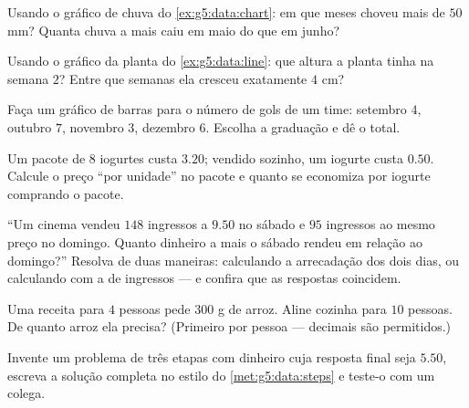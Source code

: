 \begin{exercise}[$\star$]\label{exo:g5:data:5}
Usando o gráfico de chuva do \cref{ex:g5:data:chart}: em que meses
choveu mais de $50$ mm? Quanta chuva a mais caiu em maio do que em
junho?
\end{exercise}

\begin{exercise}[$\star$]\label{exo:g5:data:6}
Usando o gráfico da planta do \cref{ex:g5:data:line}: que altura a
planta tinha na semana $2$? Entre que semanas ela cresceu exatamente
$4$ cm?
\end{exercise}

\begin{exercise}[$\star$]\label{exo:g5:data:7}
Faça um gráfico de barras para o número de gols de um time:
setembro $4$, outubro $7$, novembro $3$, dezembro $6$. Escolha a
graduação e dê o total.
\end{exercise}

\begin{exercise}[$\star$]\label{exo:g5:data:8}
Um pacote de $8$ iogurtes custa $3.20$; vendido sozinho, um iogurte
custa $0.50$. Calcule o preço ``por unidade'' no pacote e quanto se
economiza por iogurte comprando o pacote.
\end{exercise}

\begin{exercise}[$\star\star$]\label{exo:g5:data:9}
``Um cinema vendeu $148$ ingressos a $9.50$ no sábado e $95$
ingressos ao mesmo preço no domingo. Quanto dinheiro a mais o sábado
rendeu em relação ao domingo?'' Resolva de duas maneiras: calculando
a arrecadação dos dois dias, ou calculando com a \emph{} de
ingressos --- e confira que as respostas coincidem.
\end{exercise}

\begin{exercise}[$\star\star$]\label{exo:g5:data:10}
Uma receita para $4$ pessoas pede $300$ g de arroz. Aline cozinha
para $10$ pessoas. De quanto arroz ela precisa? (Primeiro por pessoa
--- decimais são permitidos.)
\end{exercise}

\begin{exercise}[$\star\star$]\label{exo:g5:data:11}
Invente um problema de três etapas com dinheiro cuja resposta final
seja $5.50$, escreva a solução completa no estilo do
\cref{met:g5:data:steps} e teste-o com um colega.
\end{exercise}
